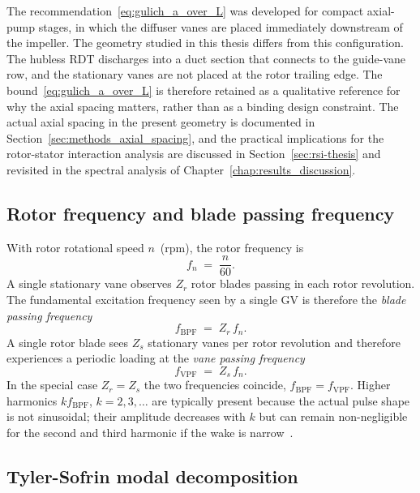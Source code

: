 The recommendation~\eqref{eq:gulich_a_over_L} was developed for compact axial-pump stages, in which the diffuser vanes are placed immediately downstream of the impeller. The geometry studied in this thesis differs from this configuration. The hubless RDT discharges into a duct section that connects to the guide-vane row, and the stationary vanes are not placed at the rotor trailing edge. The bound~\eqref{eq:gulich_a_over_L} is therefore retained as a qualitative reference for why the axial spacing matters, rather than as a binding design constraint. The actual axial spacing in the present geometry is documented in Section~\ref{sec:methods_axial_spacing}, and the practical implications for the rotor-stator interaction analysis are discussed in Section~\ref{sec:rsi-thesis} and revisited in the spectral analysis of Chapter~\ref{chap:results_discussion}.

\subsection{Rotor frequency and blade passing frequency}
\label{sec:rsi-bpf}
 
With rotor rotational speed $n$~(rpm), the rotor frequency is
\begin{equation}
    f_n \;=\; \frac{n}{60}. \label{eq:fn}
\end{equation}
A single stationary vane observes $Z_r$ rotor blades passing in each rotor revolution. The fundamental excitation frequency seen by a single GV is therefore the \emph{blade passing frequency}~\cite{Brekke2015}
\begin{equation}
    f_{\mathrm{BPF}} \;=\; Z_r\, f_n. \label{eq:fbpf}
\end{equation}
A single rotor blade sees $Z_s$ stationary vanes per rotor revolution and therefore experiences a periodic loading at the \emph{vane passing frequency}
\begin{equation}
    f_{\mathrm{VPF}} \;=\; Z_s\, f_n. \label{eq:fvpf}
\end{equation}
In the special case $Z_r = Z_s$ the two frequencies coincide, $f_{\mathrm{BPF}} = f_{\mathrm{VPF}}$. Higher harmonics $k f_{\mathrm{BPF}}$, $k=2,3,\dots$ are typically present because the actual pulse shape is not sinusoidal; their amplitude decreases with $k$ but can remain non-negligible for the second and third harmonic if the wake is narrow~\cite{Egusquiza2006,Rodriguez2007}.
 
\subsection{Tyler-Sofrin modal decomposition}
\label{sec:rsi-tyler}
 
